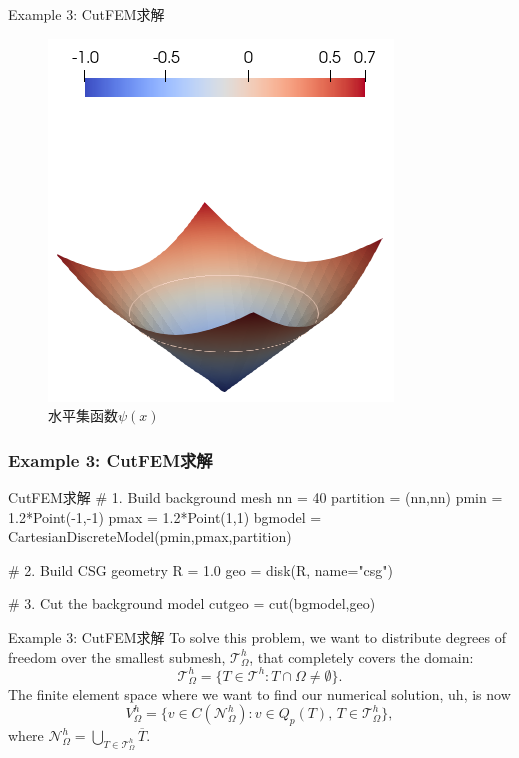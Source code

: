 \documentclass[lang=en,aspectratio=43,theme=default,logo=on]{simplebeamer}
\begin{document}
\begin{frame}{Example 3: CutFEM求解}
\begin{figure}
\begin{minipage}[t]{0.5\linewidth}
            \includegraphics[height=0.6\textheight]{./img/019.png}
            \caption{水平集函数$\psi(x)$}
        \end{minipage}
    \end{figure}
\end{frame}

\begin{frame}[fragile]
    \frametitle{Example 3: CutFEM求解}
\begin{code}{1}{CutFEM求解}
# 1. Build background mesh
nn = 40
partition = (nn,nn)
pmin = 1.2*Point(-1,-1)
pmax = 1.2*Point(1,1)
bgmodel = CartesianDiscreteModel(pmin,pmax,partition)

# 2. Build CSG geometry
R = 1.0
geo = disk(R, name="csg")

# 3. Cut the background model
cutgeo = cut(bgmodel,geo)
\end{code}
\end{frame}

\begin{frame}{Example 3: CutFEM求解}
To solve this problem, we want to distribute degrees of freedom over the smallest submesh, $\mathcal{T}_\Omega^h$, that completely covers the domain:
    \begin{equation*}
        \mathcal{T}_\Omega^h = \{ T \in \mathcal{T}^{h} : T \cap \Omega \neq \emptyset \}.
    \end{equation*}
The finite element space where we want to find our numerical solution, uh, is now
\begin{equation*}
    V_\Omega^h = \{ v \in C(\mathcal{N}_\Omega^h) : v \in Q_p(T), \, T \in \mathcal{T}_\Omega^h \},
\end{equation*}
where $\mathcal{N}_\Omega^h = \bigcup_{T \in \mathcal{T}_\Omega^h} \overline{T}$.
\end{frame}
\end{document}
